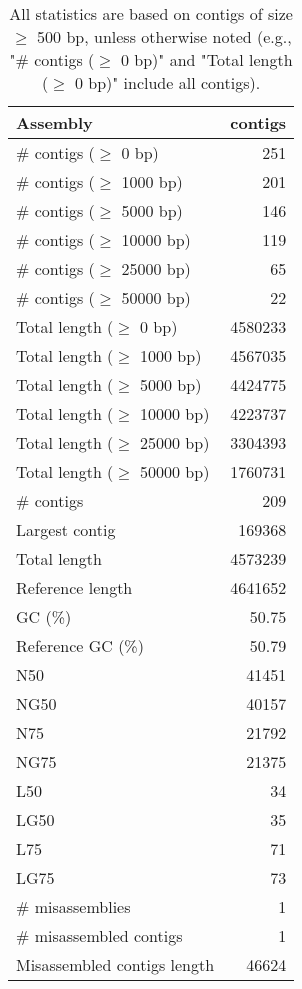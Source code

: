 \documentclass[12pt,a4paper]{article}
\begin{document}
\begin{table}[ht]
\begin{center}
\caption{All statistics are based on contigs of size $\geq$ 500 bp, unless otherwise noted (e.g., "\# contigs ($\geq$ 0 bp)" and "Total length ($\geq$ 0 bp)" include all contigs).}
\begin{tabular}{|l*{1}{|r}|}
\hline
Assembly & contigs \\ \hline
\# contigs ($\geq$ 0 bp) & 251 \\ \hline
\# contigs ($\geq$ 1000 bp) & 201 \\ \hline
\# contigs ($\geq$ 5000 bp) & 146 \\ \hline
\# contigs ($\geq$ 10000 bp) & 119 \\ \hline
\# contigs ($\geq$ 25000 bp) & 65 \\ \hline
\# contigs ($\geq$ 50000 bp) & 22 \\ \hline
Total length ($\geq$ 0 bp) & 4580233 \\ \hline
Total length ($\geq$ 1000 bp) & 4567035 \\ \hline
Total length ($\geq$ 5000 bp) & 4424775 \\ \hline
Total length ($\geq$ 10000 bp) & 4223737 \\ \hline
Total length ($\geq$ 25000 bp) & 3304393 \\ \hline
Total length ($\geq$ 50000 bp) & 1760731 \\ \hline
\# contigs & 209 \\ \hline
Largest contig & 169368 \\ \hline
Total length & 4573239 \\ \hline
Reference length & 4641652 \\ \hline
GC (\%) & 50.75 \\ \hline
Reference GC (\%) & 50.79 \\ \hline
N50 & 41451 \\ \hline
NG50 & 40157 \\ \hline
N75 & 21792 \\ \hline
NG75 & 21375 \\ \hline
L50 & 34 \\ \hline
LG50 & 35 \\ \hline
L75 & 71 \\ \hline
LG75 & 73 \\ \hline
\# misassemblies & 1 \\ \hline
\# misassembled contigs & 1 \\ \hline
Misassembled contigs length & 46624 \\ \hline

\end{tabular}
\end{center}
\end{table}
\end{document}
